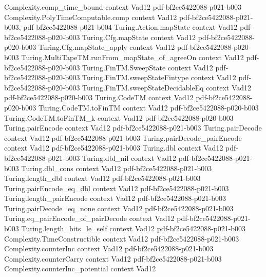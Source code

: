 \begin{theorem}
\proofstep
  {Complexity.comp_time_bound}
  {context}
  {Vad12}
  {pdf-bf2ce5422088-p021-b003}
\proofstep
  {Complexity.PolyTimeComputable.comp}
  {context}
  {Vad12}
  {pdf-bf2ce5422088-p021-b003,
    pdf-bf2ce5422088-p021-b004}
\proofstep
  {Turing.Action.mapState}
  {context}
  {Vad12}
  {pdf-bf2ce5422088-p020-b003}
\proofstep
  {Turing.Cfg.mapState}
  {context}
  {Vad12}
  {pdf-bf2ce5422088-p020-b003}
\proofstep
  {Turing.Cfg.mapState_apply}
  {context}
  {Vad12}
  {pdf-bf2ce5422088-p020-b003}
\proofstep
  {Turing.MultiTapeTM.runFrom_mapState_of_agreeOn}
  {context}
  {Vad12}
  {pdf-bf2ce5422088-p020-b003}
\proofstep
  {Turing.FinTM.SweepState}
  {context}
  {Vad12}
  {pdf-bf2ce5422088-p020-b003}
\proofstep
  {Turing.FinTM.sweepStateFintype}
  {context}
  {Vad12}
  {pdf-bf2ce5422088-p020-b003}
\proofstep
  {Turing.FinTM.sweepStateDecidableEq}
  {context}
  {Vad12}
  {pdf-bf2ce5422088-p020-b003}
\proofstep
  {Turing.CodeTM}
  {context}
  {Vad12}
  {pdf-bf2ce5422088-p020-b003}
\proofstep
  {Turing.CodeTM.toFinTM}
  {context}
  {Vad12}
  {pdf-bf2ce5422088-p020-b003}
\proofstep
  {Turing.CodeTM.toFinTM_k}
  {context}
  {Vad12}
  {pdf-bf2ce5422088-p020-b003}
\proofstep
  {Turing.pairEncode}
  {context}
  {Vad12}
  {pdf-bf2ce5422088-p021-b003}
\proofstep
  {Turing.pairDecode}
  {context}
  {Vad12}
  {pdf-bf2ce5422088-p021-b003}
\proofstep
  {Turing.pairDecode_pairEncode}
  {context}
  {Vad12}
  {pdf-bf2ce5422088-p021-b003}
\proofstep
  {Turing.dbl}
  {context}
  {Vad12}
  {pdf-bf2ce5422088-p021-b003}
\proofstep
  {Turing.dbl_nil}
  {context}
  {Vad12}
  {pdf-bf2ce5422088-p021-b003}
\proofstep
  {Turing.dbl_cons}
  {context}
  {Vad12}
  {pdf-bf2ce5422088-p021-b003}
\proofstep
  {Turing.length_dbl}
  {context}
  {Vad12}
  {pdf-bf2ce5422088-p021-b003}
\proofstep
  {Turing.pairEncode_eq_dbl}
  {context}
  {Vad12}
  {pdf-bf2ce5422088-p021-b003}
\proofstep
  {Turing.length_pairEncode}
  {context}
  {Vad12}
  {pdf-bf2ce5422088-p021-b003}
\proofstep
  {Turing.pairDecode_eq_none}
  {context}
  {Vad12}
  {pdf-bf2ce5422088-p021-b003}
\proofstep
  {Turing.eq_pairEncode_of_pairDecode}
  {context}
  {Vad12}
  {pdf-bf2ce5422088-p021-b003}
\proofstep
  {Turing.length_bits_le_self}
  {context}
  {Vad12}
  {pdf-bf2ce5422088-p021-b003}
\proofstep
  {Complexity.TimeConstructible}
  {context}
  {Vad12}
  {pdf-bf2ce5422088-p021-b003}
\proofstep
  {Complexity.counterInc}
  {context}
  {Vad12}
  {pdf-bf2ce5422088-p021-b003}
\proofstep
  {Complexity.counterCarry}
  {context}
  {Vad12}
  {pdf-bf2ce5422088-p021-b003}
\proofstep
  {Complexity.counterInc_potential}
  {context}
  {Vad12}

\end{theorem}
